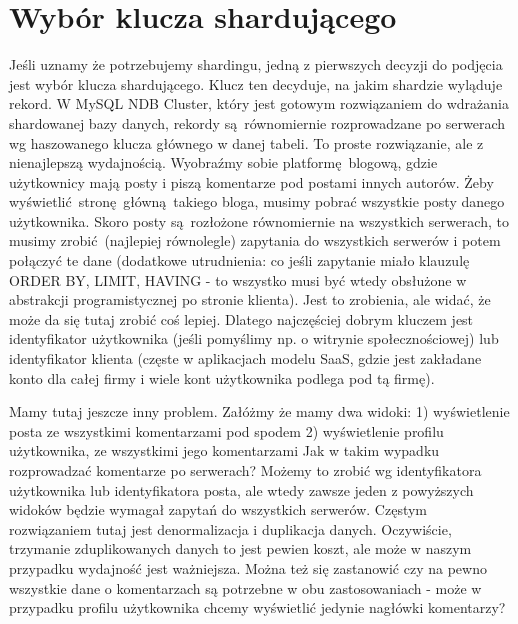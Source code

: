 \documentclass[a4paper,12pt]{article}
\begin{document}
\section{Wybór klucza shardującego}

Jeśli uznamy że potrzebujemy shardingu, jedną z pierwszych decyzji do podjęcia jest wybór klucza shardującego. Klucz ten decyduje, na jakim shardzie wyląduje rekord. W MySQL NDB Cluster, który jest gotowym rozwiązaniem do wdrażania shardowanej bazy danych, rekordy są równomiernie rozprowadzane po serwerach wg haszowanego klucza głównego w danej tabeli. To proste rozwiązanie, ale z nienajlepszą wydajnością. Wyobraźmy sobie platformę blogową, gdzie użytkownicy mają posty i piszą komentarze pod postami innych autorów. Żeby wyświetlić stronę główną takiego bloga, musimy pobrać wszystkie posty danego użytkownika. Skoro posty są rozłożone równomiernie na wszystkich serwerach, to musimy zrobić (najlepiej równolegle) zapytania do wszystkich serwerów i potem połączyć te dane (dodatkowe utrudnienia: co jeśli zapytanie miało klauzulę ORDER BY, LIMIT, HAVING - to wszystko musi być wtedy obsłużone w abstrakcji programistycznej po stronie klienta). Jest to zrobienia, ale widać, że może da się tutaj zrobić coś lepiej. Dlatego najczęściej dobrym kluczem jest identyfikator użytkownika (jeśli pomyślimy np. o witrynie społecznościowej) lub identyfikator klienta (częste w aplikacjach modelu SaaS, gdzie jest zakładane konto dla całej firmy i wiele kont użytkownika podlega pod tą firmę).

Mamy tutaj jeszcze inny problem. Załóżmy że mamy dwa widoki:
1) wyświetlenie posta ze wszystkimi komentarzami pod spodem
2) wyświetlenie profilu użytkownika, ze wszystkimi jego komentarzami
Jak w takim wypadku rozprowadzać komentarze po serwerach? Możemy to zrobić wg identyfikatora użytkownika lub identyfikatora posta, ale wtedy zawsze jeden z powyższych widoków będzie wymagał zapytań do wszystkich serwerów. Częstym rozwiązaniem tutaj jest denormalizacja i duplikacja danych. Oczywiście, trzymanie zduplikowanych danych to jest pewien koszt, ale może w naszym przypadku wydajność jest ważniejsza. Można też się zastanowić czy na pewno wszystkie dane o komentarzach są potrzebne w obu zastosowaniach - może w przypadku profilu użytkownika chcemy wyświetlić jedynie nagłówki komentarzy?
\end{document}
